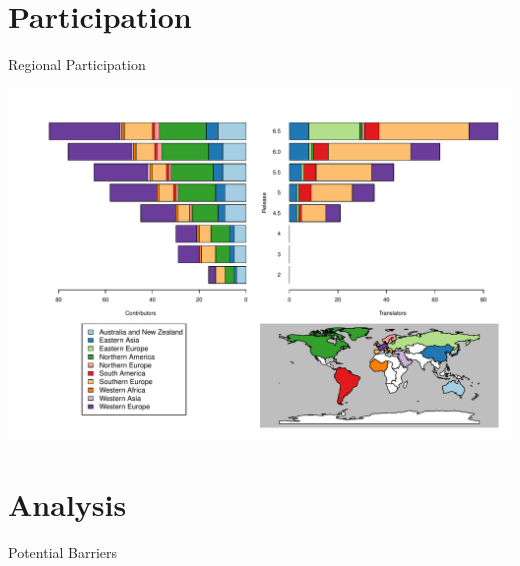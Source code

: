 \documentclass{beamer}
\begin{document}
\section{Participation}
\begin{frame}{Regional Participation}
\vspace{-.3in}
	\begin{center}
		\includegraphics[width=1\textwidth]{RegionalParticipation.pdf}
		
	\end{center}
\end{frame}

\section{Analysis}

\begin{frame}{Potential Barriers}
\vspace{-.3in}
	\begin{center}
		\begin{scriptsize}
		\end{scriptsize}
	\end{center}
\end{frame}
\end{document}
